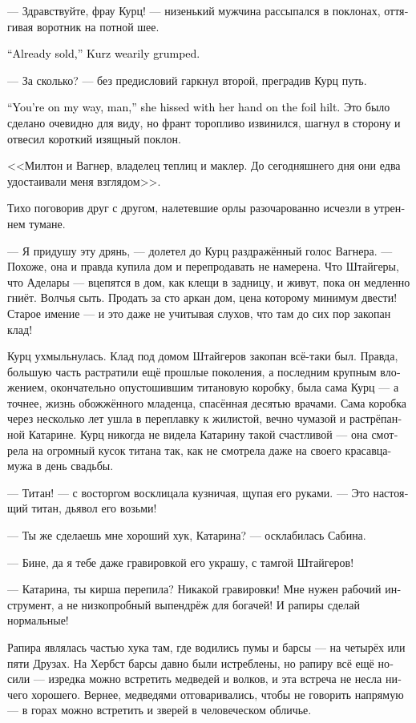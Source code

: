 \documentclass[a4paper,12pt,fleqn]{book}\usepackage{cooltooltips}\usepackage{polyglossia}\setdefaultlanguage[babelshorthands=true]{russian}\setotherlanguage{english}\defaultfontfeatures{Ligatures=TeX,Mapping=tex-text} \usepackage{xcolor}\definecolor{lightgray}{HTML}{bbbbbb}\color{lightgray}\newcommand{\ml}[3]{\textenglish{\textcolor{black}{#3}}}
\begin{document}
--- Здравствуйте, фрау Курц! --- низенький мужчина рассыпался в поклонах, оттягивая воротник на потной шее.

\ml{$0$}
{--- Уже продала, --- устало буркнула Курц.}
{``Already sold,'' Kurz wearily grumped.}

--- За сколько? --- без предисловий гаркнул второй, преградив Курц путь.

\ml{$0$}
{--- Уйди с дороги, --- процедила она, положив руку на эфес рапиры.}
{``You're on my way, man,'' she hissed with her hand on the foil hilt.}
Это было сделано очевидно для виду, но франт торопливо извинился, шагнул в сторону и отвесил короткий изящный поклон.

<<Милтон и Вагнер, владелец теплиц и маклер.
До сегодняшнего дня они едва удостаивали меня взглядом>>.

Тихо поговорив друг с другом, налетевшие орлы разочарованно исчезли в утреннем тумане.

--- Я придушу эту дрянь, --- долетел до Курц раздражённый голос Вагнера.
--- Похоже, она и правда купила дом и перепродавать не намерена.
Что Штайгеры, что Аделары --- вцепятся в дом, как клещи в задницу, и живут, пока он медленно гниёт.
Волчья сыть.
Продать за сто аркан дом, цена которому минимум двести!
Старое имение --- и это даже не учитывая слухов, что там до сих пор закопан клад!

Курц ухмыльнулась.
Клад под домом Штайгеров закопан всё-таки был.
Правда, большую часть растратили ещё прошлые поколения, а последним крупным вложением, окончательно опустошившим титановую коробку, была сама Курц --- а точнее, жизнь обожжённого младенца, спасённая десятью врачами.
Сама коробка через несколько лет ушла в переплавку к жилистой, вечно чумазой и растрёпанной Катарине.
Курц никогда не видела Катарину такой счастливой --- она смотрела на огромный кусок титана так, как не смотрела даже на своего красавца-мужа в день свадьбы.

--- Титан! --- с восторгом восклицала кузничая, щупая его руками.
--- Это настоящий титан, дьявол его возьми!

--- Ты же сделаешь мне хороший хук, Катарина? --- осклабилась Сабина.

--- Бине, да я тебе даже гравировкой его украшу, с тамгой Штайгеров!

--- Катарина, ты кирша перепила?
Никакой гравировки!
Мне нужен рабочий инструмент, а не низкопробный выпендрёж для богачей!
И рапиры сделай нормальные!

Рапира являлась частью хука там, где водились пумы и барсы --- на четырёх или пяти Друзах.
На Хербст барсы давно были истреблены, но рапиру всё ещё носили --- изредка можно встретить медведей и волков, и эта встреча не несла ничего хорошего.
Вернее, медведями отговаривались, чтобы не говорить напрямую --- в горах можно встретить и зверей в человеческом обличье.
\end{document}
